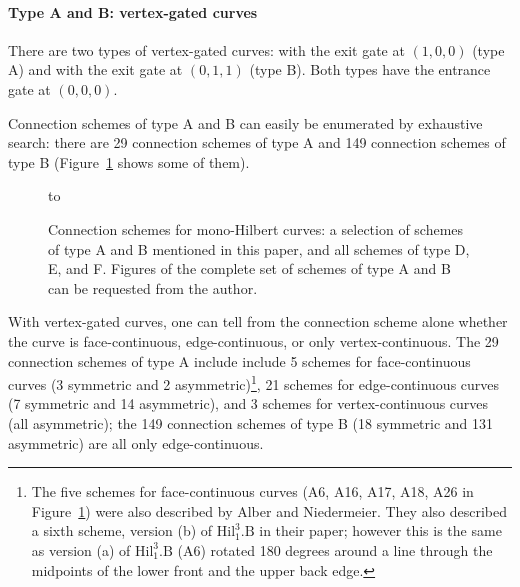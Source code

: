 \documentclass[11pt,a4paper]{article}
\begin{document}
\paragraph{Type A and B: vertex-gated curves}
There are two types of vertex-gated curves: with the exit gate at $(1,0,0)$ (type A) and with the exit gate at $(0,1,1)$ (type B). Both types have the entrance gate at $(0,0,0)$.

Connection schemes of type A and B can easily be enumerated by exhaustive search: there are 29 connection schemes of type A and 149 connection schemes of type B (Figure~\ref{fig:connection-schemes} shows some of them).

\begin{figure}
\centering
\hbox to
\caption{Connection schemes for mono-Hilbert curves: a selection of schemes of type A and B mentioned in this paper, and all schemes of type D, E, and F. Figures of the complete set of schemes of type A and B can be requested from the author.}\label{fig:connection-schemes}
\end{figure}

With vertex-gated curves, one can tell from the connection scheme alone whether the curve is face-continuous, edge-continuous, or only vertex-continuous. The 29 connection schemes of type A include include 5 schemes for face-continuous curves (3 symmetric and 2 asymmetric)\footnote{The five schemes for face-continuous curves (A6, A16, A17, A18, A26 in Figure~\ref{fig:connection-schemes}) were also described by Alber and Niedermeier. They also described a sixth scheme, version (b) of $\mathrm{Hil}^3_1.\mathrm{B}$ in their paper; however this is the same as version (a) of $\mathrm{Hil}^3_1.\mathrm{B}$ (A6) rotated 180 degrees around a line through the midpoints of the lower front and the upper back edge.}, 21 schemes for edge-continuous curves (7 symmetric and 14 asymmetric), and 3 schemes for vertex-continuous curves (all asymmetric); the 149 connection schemes of type B (18 symmetric and 131 asymmetric) are all only edge-continuous.
\end{document}
